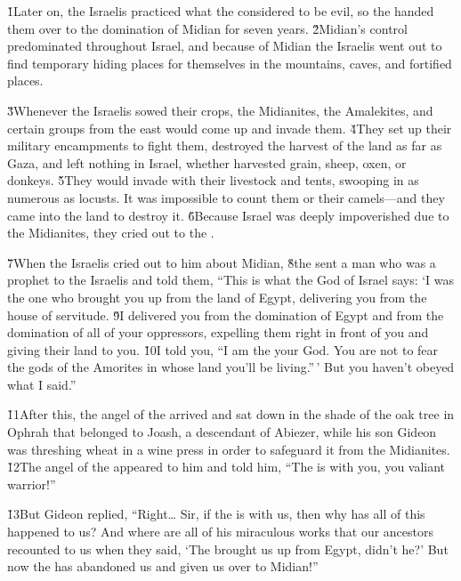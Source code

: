 \v{1}Later on, the Israelis practiced what the  considered to be evil, so the  handed them over to the domination of Midian for seven years. \v{2}Midian's control predominated throughout Israel, and because of Midian the Israelis went out to find temporary hiding places for themselves in the mountains, caves, and fortified places.

\v{3}Whenever the Israelis sowed their crops, the Midianites, the Amalekites, and certain groups from the east would come up and invade them. \v{4}They set up their military encampments to fight them, destroyed the harvest of the land as far as Gaza, and left nothing in Israel, whether harvested grain, sheep, oxen, or donkeys. \v{5}They would invade with their livestock and tents, swooping in as numerous as locusts. It was impossible to count them or their camels---and they came into the land to destroy it. \v{6}Because Israel was deeply impoverished due to the Midianites, they cried out to the .

\v{7}When the Israelis cried out to him about Midian, \v{8}the  sent a man who was a prophet to the Israelis and told them, ``This is what the  God of Israel says: `I was the one who brought you up from the land of Egypt, delivering you from the house of servitude. \v{9}I delivered you from the domination of Egypt and from the domination of all of your oppressors, expelling them right in front of you and giving their land to you. \v{10}I told you, ``I am the  your God. You are not to fear the gods of the Amorites in whose land you'll be living.''\,' But you haven't obeyed what I said.''

\v{11}After this, the angel of the  arrived and sat down in the shade of the oak tree in Ophrah that belonged to Joash, a descendant of Abiezer, while his son Gideon was threshing wheat in a wine press in order to safeguard it from the Midianites. \v{12}The angel of the  appeared to him and told him, ``The  is with you, you valiant warrior!''

\v{13}But Gideon replied, ``Right{\ldots} Sir, if the  is with us, then why has all of this happened to us? And where are all of his miraculous works that our ancestors recounted to us when they said, `The  brought us up from Egypt, didn't he?' But now the  has abandoned us and given us over to Midian!''

